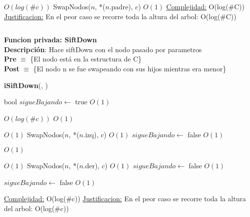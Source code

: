 \begin{Algoritmos}
\begin{algorithm}[H]
\begin{algorithmic}[1]
     \Comment $O(log(\#c))$
        \State SwapNodos($n$, *($n$.padre), $c$) \Comment $O(1)$
    \EndWhile
    \medskip
    \Statex \underline{Complejidad:} O(log($\#$C))
    \Statex \underline{Justificacion:} En el peor caso se recorre toda la altura del arbol: O(log($\#$C))
\end{algorithmic}
\end{algorithm}



$ $\newline

\textbf{Funcion privada: SiftDown}\\
\textbf{Descripci\'on}: Hace siftDown con el nodo pasado por parametros\\
\textbf{Pre} $\equiv$ \{El nodo est\'a en la estructura de C\}\\%
\textbf{Post} $\equiv$ \{El nodo n se fue swapeando con sus hijos mientras era menor\}%
\begin{algorithm}[H]
{\textbf{iSiftDown}(, )}
\begin{algorithmic}[1]

    \State bool $sigueBajando \gets$ true \Comment $O(1)$

      \Comment $O(log(\#c))$
         \Comment $O(1)$ 

             \Comment $O(1)$
                \State SwapNodos($n$, *($n$.izq), $c$) \Comment $O(1)$
            \Else
                \State $sigueBajando \gets$ false \Comment $O(1)$
            \EndIf

        \Else
             \Comment $O(1)$
            
                 \Comment $O(1)$
                    \State SwapNodos($n$, *($n$.der), $c$) \Comment $O(1)$
                \Else
                    \State $sigueBajando \gets$ false \Comment $O(1)$
                \EndIf
            
            \Else
                \State $sigueBajando \gets$ false \Comment $O(1)$
            \EndIf
        \EndIf


    \EndWhile 

    \medskip
    \Statex \underline{Complejidad:} O(log($\#$c))
    \Statex \underline{Justificacion:} En el peor caso se recorre toda la altura del arbol: O(log($\#$c))
\end{algorithmic}
\end{algorithm}




\end{Algoritmos}

